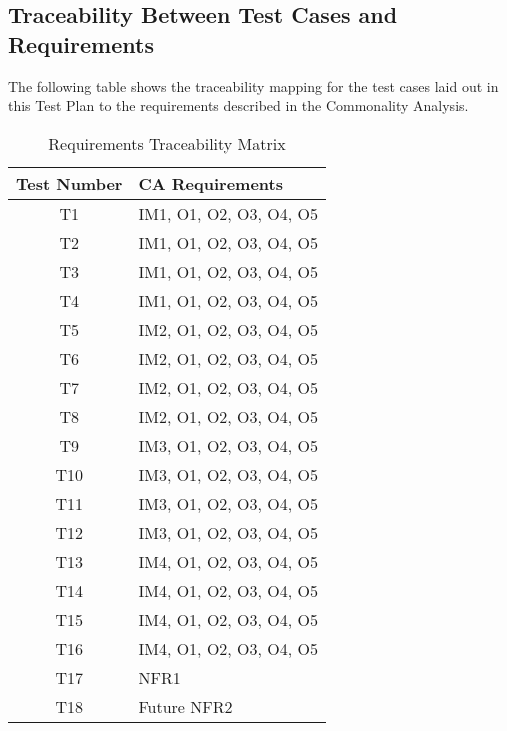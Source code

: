 \documentclass[12pt, titlepage]{article}
\begin{document}
%
%					
%					
%					
%					

%

\subsection{Traceability Between Test Cases and Requirements}
The following table shows the traceability mapping for the test cases laid out in this Test Plan to the requirements 
described in the Commonality Analysis.

\begin{table} [H]
  \caption{Requirements Traceability Matrix}
  \label{Table:Table_Traceability}  
\begin{tabular}{|c|p{8cm}|}
  \hline	
  \textbf{Test Number} & \textbf{CA Requirements}\\
  \hline 
   T1& IM1, O1, O2, O3, O4, O5\\ \hline
   T2& IM1, O1, O2, O3, O4, O5\\ \hline
   T3& IM1, O1, O2, O3, O4, O5\\ \hline
   T4& IM1, O1, O2, O3, O4, O5\\ \hline
   T5& IM2, O1, O2, O3, O4, O5\\ \hline
   T6& IM2, O1, O2, O3, O4, O5\\ \hline
   T7& IM2, O1, O2, O3, O4, O5\\ \hline
   T8& IM2, O1, O2, O3, O4, O5\\ \hline
   T9& IM3, O1, O2, O3, O4, O5\\ \hline
   T10& IM3, O1, O2, O3, O4, O5\\ \hline
   T11& IM3, O1, O2, O3, O4, O5\\ \hline
   T12& IM3, O1, O2, O3, O4, O5\\ \hline
   T13& IM4, O1, O2, O3, O4, O5\\ \hline
   T14& IM4, O1, O2, O3, O4, O5\\ \hline
   T15& IM4, O1, O2, O3, O4, O5\\ \hline
   T16& IM4, O1, O2, O3, O4, O5\\ \hline
   T17& NFR1\\ \hline
   T18& Future NFR2\\ \hline

\end{tabular}\\
\end{table}
				
\end{document}
